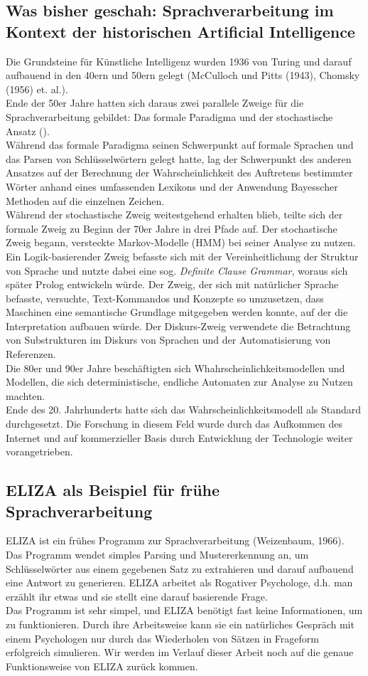\documentclass[12pt,twoside]{article}
\theoremstyle{plain}
\theoremstyle{definition}
\theoremstyle{remark}
\begin{document}
	\subsection{Was bisher geschah: Sprachverarbeitung im Kontext der historischen Artificial Intelligence}
	\label{ssec:history}
	Die Grundsteine für Künstliche Intelligenz wurden 1936 von Turing und darauf aufbauend in den 40ern und 50ern gelegt (McCulloch und Pitts (1943), Chomsky (1956) et. al.).\\
	Ende der 50er Jahre hatten sich daraus zwei parallele Zweige für die Sprachverarbeitung gebildet: Das formale Paradigma und der stochastische Ansatz (\cite{Jur2009}).\\
	Während das formale Paradigma seinen Schwerpunkt auf formale Sprachen und das Parsen von Schlüsselwörtern gelegt hatte, lag der Schwerpunkt des anderen Ansatzes auf der Berechnung der Wahrscheinlichkeit des Auftretens bestimmter Wörter anhand eines umfassenden Lexikons und der Anwendung Bayesscher Methoden auf die einzelnen Zeichen.\\
	Während der stochastische Zweig weitestgehend erhalten blieb, teilte sich der formale Zweig zu Beginn der 70er Jahre in drei Pfade auf.
	Der stochastische Zweig begann, versteckte Markov-Modelle (HMM) bei seiner Analyse zu nutzen.
	Ein Logik-basierender Zweig befasste sich mit der Vereinheitlichung der Struktur von Sprache und nutzte dabei eine sog. \textit{Definite Clause Grammar}, woraus sich später Prolog entwickeln würde.
	Der Zweig, der sich mit natürlicher Sprache befasste, versuchte, Text-Kommandos und Konzepte so umzusetzen, dass Maschinen eine semantische Grundlage mitgegeben werden konnte, auf der die Interpretation aufbauen würde.
	Der Diskurs-Zweig verwendete die Betrachtung von Substrukturen im Diskurs von Sprachen und der Automatisierung von Referenzen.\\
	Die 80er und 90er Jahre beschäftigten sich Whahrscheinlichkeitsmodellen und Modellen, die sich deterministische, endliche Automaten zur Analyse zu Nutzen machten.\\
	Ende des 20. Jahrhunderts hatte sich das Wahrscheinlichkeitsmodell als Standard durchgesetzt. Die Forschung in diesem Feld wurde durch das Aufkommen des Internet und auf kommerzieller Basis durch Entwicklung der Technologie weiter vorangetrieben.
	\subsection{ELIZA als Beispiel für frühe Sprachverarbeitung}
	\label{ssec:eliza}
	ELIZA ist ein frühes Programm zur Sprachverarbeitung (Weizenbaum, 1966).
	Das Programm wendet simples Parsing und Mustererkennung an, um Schlüsselwörter aus einem gegebenen Satz zu extrahieren und darauf aufbauend eine Antwort zu generieren.
	ELIZA arbeitet als Rogativer Psychologe, d.h. man erzählt ihr etwas und sie stellt eine darauf basierende Frage.\\
	Das Programm ist sehr simpel, und ELIZA benötigt fast keine Informationen, um zu funktionieren.
	Durch ihre Arbeitsweise kann sie ein natürliches Gespräch mit einem Psychologen nur durch das Wiederholen von Sätzen in Frageform erfolgreich simulieren.
	Wir werden im Verlauf dieser Arbeit noch auf die genaue Funktionsweise von ELIZA zurück kommen.
\end{document}
